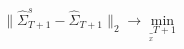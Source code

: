 \documentclass{article}
\begin{document}
\begin{equation}
    \| \hat{\Sigma}_{T+1}^s - \hat{\Sigma}_{T+1} \|_2 \to \min_{\underset x_{T+1}}
\end{equation}












\end{document}
